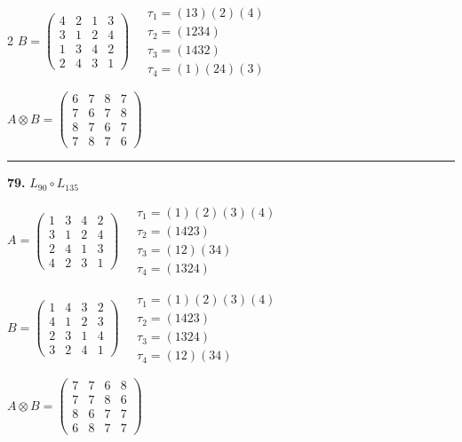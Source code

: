\begin{multicols}{2}
$B = \begin{pmatrix} 4 & 2 & 1 & 3 \\ 3 & 1 & 2 & 4 \\ 1 & 3 & 4 & 2 \\ 2 & 4 & 3 & 1 \end{pmatrix} \quad \begin{matrix} \tau_{1}=(1 3)(2)(4) \\ \tau_{2}=(1 2 3 4) \\ \tau_{3}=(1 4 3 2) \\ \tau_{4}=(1)(2 4)(3) \end{matrix}$

$A \otimes B = \begin{pmatrix} 6 & 7 & 8 & 7 \\ 7 & 6 & 7 & 8 \\ 8 & 7 & 6 & 7 \\ 7 & 8 & 7 & 6 \end{pmatrix}$

\vspace{0.3em}
\hrule
\vspace{0.3em}

\noindent\textbf{79.} $L_{90} \circ L_{135}$

$A = \begin{pmatrix} 1 & 3 & 4 & 2 \\ 3 & 1 & 2 & 4 \\ 2 & 4 & 1 & 3 \\ 4 & 2 & 3 & 1 \end{pmatrix} \quad \begin{matrix} \tau_{1}=(1)(2)(3)(4) \\ \tau_{2}=(1 4 2 3) \\ \tau_{3}=(1 2)(3 4) \\ \tau_{4}=(1 3 2 4) \end{matrix}$

$B = \begin{pmatrix} 1 & 4 & 3 & 2 \\ 4 & 1 & 2 & 3 \\ 2 & 3 & 1 & 4 \\ 3 & 2 & 4 & 1 \end{pmatrix} \quad \begin{matrix} \tau_{1}=(1)(2)(3)(4) \\ \tau_{2}=(1 4 2 3) \\ \tau_{3}=(1 3 2 4) \\ \tau_{4}=(1 2)(3 4) \end{matrix}$

$A \otimes B = \begin{pmatrix} 7 & 7 & 6 & 8 \\ 7 & 7 & 8 & 6 \\ 8 & 6 & 7 & 7 \\ 6 & 8 & 7 & 7 \end{pmatrix}$


\end{multicols}
